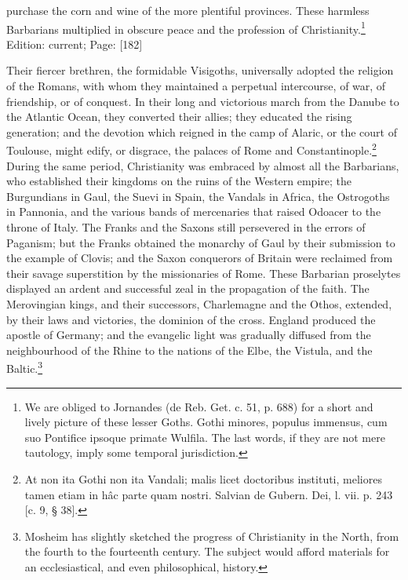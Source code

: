 purchase the corn and wine of the more plentiful provinces. These harmless Barbarians multiplied in obscure peace and the profession of Christianity.\footnote{We are obliged to Jornandes (de Reb. Get. c. 51, p. 688) for a short and lively picture of these lesser Goths. Gothi minores, populus immensus, cum suo Pontifice ipsoque primate Wulfila. The last words, if they are not mere tautology, imply some temporal jurisdiction.}
Edition: current; Page: [182]

Their fiercer brethren, the formidable Visigoths, universally adopted the religion of the Romans, with whom they maintained a perpetual intercourse, of war, of friendship, or of conquest. In their long and victorious march from the Danube to the Atlantic Ocean, they converted their allies; they educated the rising generation; and the devotion which reigned in the camp of Alaric, or the court of Toulouse, might edify, or disgrace, the palaces of Rome and Constantinople.\footnote{At non ita Gothi non ita Vandali; malis licet doctoribus instituti, meliores tamen etiam in hâc parte quam nostri. Salvian de Gubern. Dei, l. vii. p. 243 [c. 9, § 38].} During the same period, Christianity was embraced by almost all the Barbarians, who established their kingdoms on the ruins of the Western empire; the Burgundians in Gaul, the Suevi in Spain, the Vandals in Africa, the Ostrogoths in Pannonia, and the various bands of mercenaries that raised Odoacer to the throne of Italy. The Franks and the Saxons still persevered in the errors of Paganism; but the Franks obtained the monarchy of Gaul by their submission to the example of Clovis; and the Saxon conquerors of Britain were reclaimed from their savage superstition by the missionaries of Rome. These Barbarian proselytes displayed an ardent and successful zeal in the propagation of the faith. The Merovingian kings, and their successors, Charlemagne and the Othos, extended, by their laws and victories, the dominion of the cross. England produced the apostle of Germany; and the evangelic light was gradually diffused from the neighbourhood of the Rhine to the nations of the Elbe, the Vistula, and the Baltic.\footnote{Mosheim has slightly sketched the progress of Christianity in the North, from the fourth to the fourteenth century. The subject would afford materials for an ecclesiastical, and even philosophical, history.}

